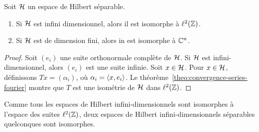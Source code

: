 \begin{theorem}
Soit $\mathcal{H}$ un espace de Hilbert s\'{e}parable.
\begin{enumerate}[label=\emph{\alph*})]
\item Si $\mathcal{H}$ est infini dimensionnel, alors il est isomorphe \`{a} $\ell^2(\mathbb{Z})$.
\item Si $\mathcal{H}$ est de dimension fini, alors in est isomorphe \`{a} $\mathbb{C}^n$.
\end{enumerate}
\end{theorem}
\begin{proof}
  Soit $(e_i)$ une suite orthonormale compl\`{e}te de $\mathcal{H}$. Si $\mathcal{H}$ est
  infini-dimensionnel, alors $(e_i)$ est une suite infinie. Soit $x \in
  \mathcal{H}$. Pour $x \in \mathcal{H}$, d\'{e}finissons $Tx= (\alpha_i)$, o\`{u} $\alpha_i =
  \left\langle x, e_i \right\rangle$. Le th\'{e}or\`{e}me~\ref{theo:convergence-series-fourier} montre que
  $T$ est une isom\'{e}trie de $\mathcal{H}$ dans $\ell^2(\mathbb{Z})$.

\end{proof}
Comme tous les espaces de Hilbert infini-dimensionnels sont isomorphes \`{a}
l'espace des suites $\ell^2(\mathbb{Z})$, deux espaces de Hilbert infini-dimensionnels
s\'{e}parables quelconques sont isomorphes.

